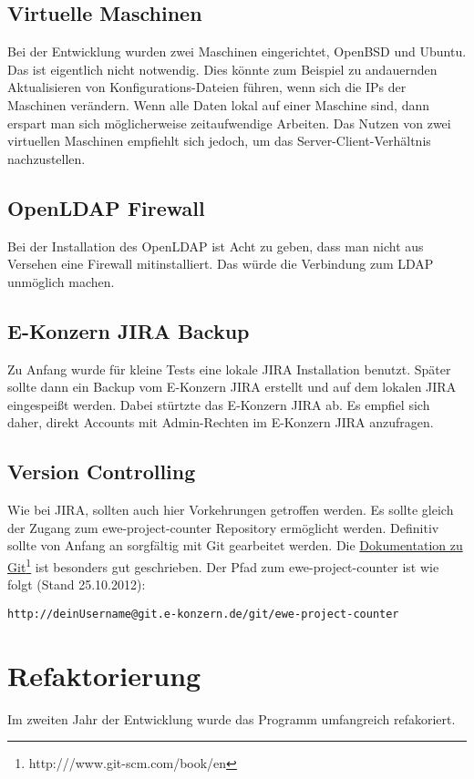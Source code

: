 \documentclass[a4paper,12pt]{report}
\begin{document}
	\section{Virtuelle Maschinen}
	Bei der Entwicklung wurden zwei Maschinen eingerichtet, OpenBSD und Ubuntu. Das ist eigentlich nicht notwendig. Dies könnte zum Beispiel zu andauernden Aktualisieren von Konfigurations-Dateien führen, wenn sich die IPs der Maschinen verändern. Wenn alle Daten lokal auf einer Maschine sind, dann erspart man sich möglicherweise zeitaufwendige Arbeiten. Das Nutzen von zwei virtuellen Maschinen empfiehlt sich jedoch, um das Server-Client-Verhältnis nachzustellen.
	
	\section{OpenLDAP Firewall}
	Bei der Installation des OpenLDAP ist Acht zu geben, dass man nicht aus Versehen eine Firewall mitinstalliert. Das würde die Verbindung zum LDAP unmöglich machen.

	\section{E-Konzern JIRA Backup}
	Zu Anfang wurde für kleine Tests eine lokale JIRA Installation benutzt. Später sollte dann ein Backup vom E-Konzern JIRA erstellt und auf dem lokalen JIRA eingespeißt werden. Dabei stürtzte das E-Konzern JIRA ab. Es empfiel sich daher, direkt Accounts mit Admin-Rechten im E-Konzern JIRA anzufragen.
	
	\section{Version Controlling}
	Wie bei JIRA, sollten auch hier Vorkehrungen getroffen werden. Es sollte gleich der Zugang zum ewe-project-counter Repository ermöglicht werden. Definitiv sollte von Anfang an sorgfältig mit Git gearbeitet werden. Die \href{http:///www.git-scm.com/book/en}{Dokumentation zu Git}\footnote{http:///www.git-scm.com/book/en} ist besonders gut geschrieben. Der Pfad zum ewe-project-counter ist wie folgt (Stand 25.10.2012):
	\begin{lstlisting}
http://deinUsername@git.e-konzern.de/git/ewe-project-counter
	\end{lstlisting}
	
\chapter{Refaktorierung}
	Im zweiten Jahr der Entwicklung wurde das Programm umfangreich refakoriert.
	
\end{document}
